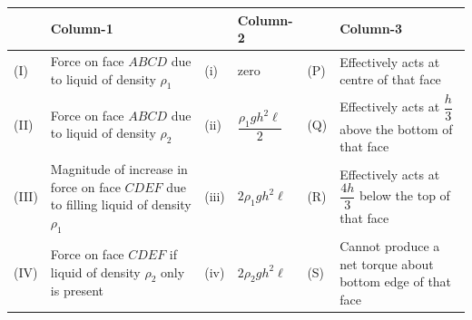 \documentclass[10pt]{extarticle}
\begin{document}
\begin{center}\small\setlength{\tabcolsep}{4pt}
\begin{tabular}{|p{0.9cm}|p{4.6cm}|p{0.9cm}|p{3.0cm}|p{0.9cm}|p{3.8cm}|}\hline
 & \textbf{Column-1} & & \textbf{Column-2} & & \textbf{Column-3}\\\hline
(I) & Force on face $ABCD$ due to liquid of density $\rho_1$ & (i) & zero & (P) & Effectively acts at centre of that face\\\hline
(II) & Force on face $ABCD$ due to liquid of density $\rho_2$ & (ii) & $\dfrac{\rho_1gh^2\ell}2$ & (Q) & Effectively acts at $\dfrac h3$ above the bottom of that face\\\hline
(III) & Magnitude of increase in force on face $CDEF$ due to filling liquid of density $\rho_1$ & (iii) & $2\rho_1gh^2\ell$ & (R) & Effectively acts at $\dfrac{4h}3$ below the top of that face\\\hline
(IV) & Force on face $CDEF$ if liquid of density $\rho_2$ only is present & (iv) & $2\rho_2gh^2\ell$ & (S) & Cannot produce a net torque about bottom edge of that face\\\hline
\end{tabular}
\end{center}
\end{document}

